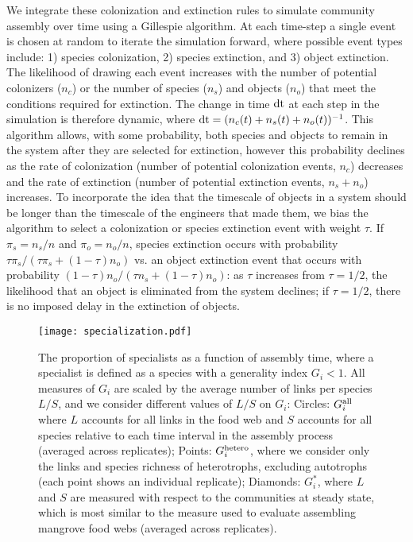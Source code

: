 \documentclass[twocolumn,preprintnumbers,amsmath,amssymb,superscriptaddress]{revtex4}
\newcommand{\rr}[1]{{\rm #1}}
\begin{document}
We integrate these colonization and extinction rules to simulate community assembly over time using a Gillespie algorithm.
At each time-step a single event is chosen at random to iterate the simulation forward, where possible event types include: 1) species colonization, 2) species extinction, and 3) object extinction.
The likelihood of drawing each event increases with the number of potential colonizers ($n_c$) or the number of species ($n_s$) and objects ($n_o$) that meet the conditions required for extinction.
The change in time $\rr{dt}$ at each step in the simulation is therefore dynamic, where $\rr{dt} = (n_c(t) + n_s(t) + n_o(t))^{-1}$.
This algorithm allows, with some probability, both species and objects to remain in the system after they are selected for extinction, however this probability declines as the rate of colonization (number of potential colonization events, $n_c$) decreases and the rate of extinction (number of potential extinction events, $n_s + n_o$) increases.
To incorporate the idea that the timescale of objects in a system should be longer than the timescale of the engineers that made them, we bias the algorithm to select a colonization or species extinction event with weight $\tau$.
If $\pi_s = n_s/n$ and $\pi_o = n_o/n$, species extinction occurs with probability $\tau \pi_s/(\tau \pi_s + (1-\tau)n_o)$ vs. an object extinction event that occurs with probability $(1-\tau) n_o/(\tau n_s + (1-\tau)n_o)$: as $\tau$ increases from $\tau=1/2$, the likelihood that an object is eliminated from the system declines; if $\tau=1/2$, there is no imposed delay in the extinction of objects.



\begin{figure}
\centering
\texttt{[image: specialization.pdf]}
\caption{
The proportion of specialists as a function of assembly time, where a specialist is defined as a species with a generality index $G_i < 1$.
All measures of $G_i$ are scaled by the average number of links per species $L/S$, and we consider different values of $L/S$ on $G_i$:
Circles: $G_i^{\rr{all}}$ where $L$ accounts for all links in the food web and $S$ accounts for all species relative to each time interval in the assembly process (averaged across replicates);
Points: $G_i^{\rr{hetero}}$, where we consider only the links and species richness of heterotrophs, excluding autotrophs (each point shows an individual replicate);
Diamonds: $G_i^*$, where $L$ and $S$ are measured with respect to the communities at steady state, which is most similar to the measure used to evaluate assembling mangrove food webs (averaged across replicates).
}
\label{fig:spec}
\end{figure} 
\end{document}
